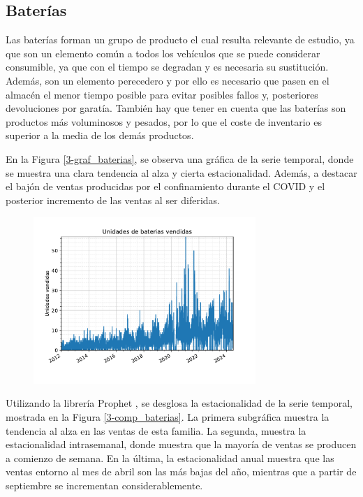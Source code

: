 \subsection{Baterías}

Las baterías forman un grupo de producto el cual resulta relevante de estudio, ya que son un elemento común a todos los vehículos que se puede considerar consumible, ya que con el tiempo se degradan y es necesaria su sustitución. Además, son un elemento perecedero y por ello es necesario que pasen en el almacén el menor tiempo posible para evitar posibles fallos y, posteriores devoluciones por garatía. También hay que tener en cuenta que las baterías son productos más voluminosos y pesados, por lo que el coste de inventario es superior a la media de los demás productos.

En la Figura \ref*{3-graf_baterias}, se observa una gráfica de la serie temporal, donde se muestra una clara tendencia al alza y cierta estacionalidad. Además, a destacar el bajón de ventas producidas por el confinamiento durante el COVID y el posterior incremento de las ventas al ser diferidas.

\begin{figure}[H]
	{\includegraphics[width=0.75\textwidth]{imagenes/grafica_baterias.pdf}}
\end{figure}

Utilizando la librería Prophet \cite{prophet}, se desglosa la estacionalidad de la serie temporal, mostrada en la Figura \ref*{3-comp_baterias}. La primera subgráfica muestra la tendencia al alza en las ventas de esta familia. La segunda, muestra la estacionalidad intrasemanal, donde muestra que la mayoría de ventas se producen a comienzo de semana. En la última, la estacionalidad anual muestra que las ventas entorno al mes de abril son las más bajas del año, mientras que a partir de septiembre se incrementan considerablemente.

